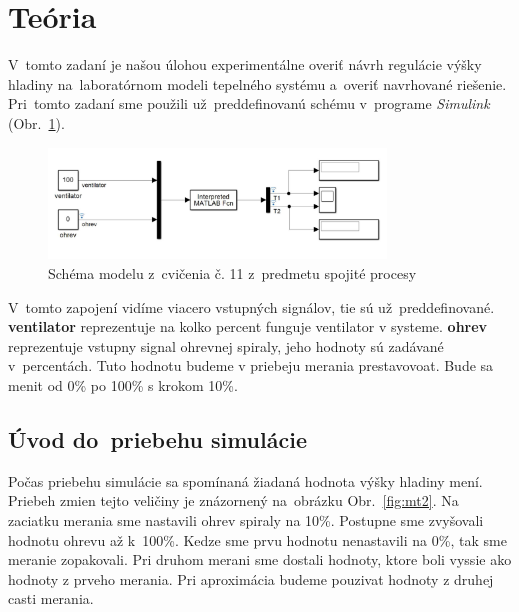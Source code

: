 \documentclass{article}
\begin{document}
\section{Teória}
\label{sec:teoria}

V~tomto zadaní je našou úlohou experimentálne overiť návrh regulácie výšky hladiny na~laboratórnom
modeli tepelného systému a~overiť navrhované riešenie. Pri~tomto zadaní sme použili už~preddefinovanú schému
v~programe \textit{Simulink} (Obr.~\ref{fig:schema}).

\begin{figure}[!htbp]
	\begin{center}
		\includegraphics[width=0.8\textwidth]{./include/schema.png}
	\end{center}
	\caption{Schéma modelu z~cvičenia č. 11 z~predmetu spojité procesy}
	\label{fig:schema}
\end{figure}

V~tomto zapojení vidíme viacero vstupných signálov, tie sú už~preddefinované. \textbf{ventilator} reprezentuje na kolko percent funguje ventilator v systeme. \textbf{ohrev} reprezentuje vstupny signal ohrevnej spiraly, jeho hodnoty
sú zadávané v~percentách. Tuto hodnotu budeme v priebeju merania prestavovoat. Bude sa menit od 0\% po 100\% s krokom 10\%.

\clearpage

\subsection{Úvod do~priebehu simulácie}
\label{subsec:priebehSimulacie}

Počas priebehu simulácie sa spomínaná žiadaná hodnota výšky hladiny mení. Priebeh zmien tejto veličiny je znázornený na~obrázku Obr.~\ref{fig:mt2}.
Na zaciatku merania sme nastavili ohrev spiraly na 10\%. Postupne sme zvyšovali hodnotu ohrevu až k~100\%.
Kedze sme prvu hodnotu nenastavili na 0\%, tak sme meranie zopakovali. Pri druhom merani sme dostali hodnoty,
ktore boli vyssie ako hodnoty z prveho merania. Pri aproximácia budeme pouzivat hodnoty z druhej casti merania.
\end{document}
